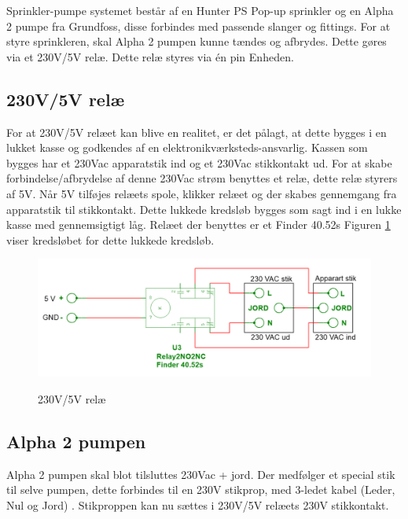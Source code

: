 Sprinkler-pumpe systemet består af en Hunter PS Pop-up sprinkler og en Alpha 2 pumpe fra Grundfoss, disse forbindes med passende slanger og fittings. For at styre sprinkleren, skal Alpha 2 pumpen kunne tændes og afbrydes. Dette gøres via et 230V/5V relæ. Dette relæ styres via én pin Enheden. 





\subsection{230V/5V relæ}

For at 230V/5V relæet kan blive en realitet, er det pålagt, at dette bygges i en lukket kasse og godkendes af en elektronikværksteds-ansvarlig. Kassen som bygges har et 230Vac apparatstik ind og et 230Vac stikkontakt ud. For at skabe forbindelse/afbrydelse af denne 230Vac strøm benyttes et relæ, dette relæ styrers af 5V. Når 5V  tilføjes relæets spole, klikker relæet og der skabes gennemgang fra apparatstik til stikkontakt. Dette lukkede kredsløb bygges som sagt ind i en lukke kasse med gennemsigtigt låg. Relæet der benyttes er et Finder 40.52s Figuren \ref{lab:RELAY} viser kredsløbet for dette lukkede kredsløb.

\begin{figure}[H] \centering
{\includegraphics[width=\textwidth]{filer/design/Billeder/230VAC_KREDS}}
\caption{230V/5V relæ}
\label{lab:RELAY}
\raggedright
\end{figure}

\subsection{Alpha 2 pumpen}

Alpha 2 pumpen skal blot tilsluttes 230Vac + jord. Der medfølger et special stik til selve pumpen, dette forbindes til en 230V stikprop, med 3-ledet kabel (Leder, Nul og Jord) . Stikproppen kan nu sættes i 230V/5V relæets 230V stikkontakt.

